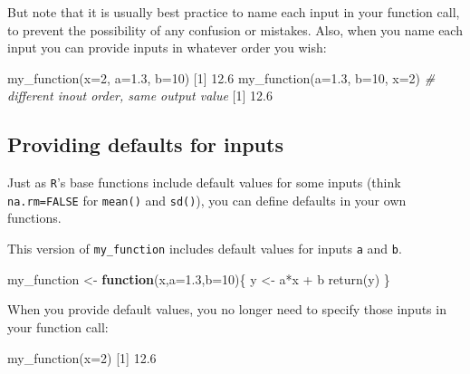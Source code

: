 \documentclass[
]{book}
\newenvironment{Shaded}{\begin{snugshade}}{\end{snugshade}}
\newcommand{\AttributeTok}[1]{\textcolor[rgb]{0.77,0.63,0.00}{#1}}
\newcommand{\CommentTok}[1]{\textcolor[rgb]{0.56,0.35,0.01}{\textit{#1}}}
\newcommand{\ControlFlowTok}[1]{\textcolor[rgb]{0.13,0.29,0.53}{\textbf{#1}}}
\newcommand{\DecValTok}[1]{\textcolor[rgb]{0.00,0.00,0.81}{#1}}
\newcommand{\FloatTok}[1]{\textcolor[rgb]{0.00,0.00,0.81}{#1}}
\newcommand{\FunctionTok}[1]{\textcolor[rgb]{0.00,0.00,0.00}{#1}}
\newcommand{\NormalTok}[1]{#1}
\newcommand{\OtherTok}[1]{\textcolor[rgb]{0.56,0.35,0.01}{#1}}
\newcommand{\SpecialCharTok}[1]{\textcolor[rgb]{0.00,0.00,0.00}{#1}}
\begin{document}
But note that it is usually best practice to name each input in your function call, to prevent the possibility of any confusion or mistakes. Also, when you name each input you can provide inputs in whatever order you wish:

\begin{Shaded}
\begin{Highlighting}[]
\FunctionTok{my\_function}\NormalTok{(}\AttributeTok{x=}\DecValTok{2}\NormalTok{, }\AttributeTok{a=}\FloatTok{1.3}\NormalTok{, }\AttributeTok{b=}\DecValTok{10}\NormalTok{)}
\NormalTok{[}\DecValTok{1}\NormalTok{] }\FloatTok{12.6}
\FunctionTok{my\_function}\NormalTok{(}\AttributeTok{a=}\FloatTok{1.3}\NormalTok{, }\AttributeTok{b=}\DecValTok{10}\NormalTok{, }\AttributeTok{x=}\DecValTok{2}\NormalTok{) }\CommentTok{\# different inout order, same output value}
\NormalTok{[}\DecValTok{1}\NormalTok{] }\FloatTok{12.6}
\end{Highlighting}
\end{Shaded}

\hypertarget{providing-defaults-for-inputs}{%
\subsection*{Providing defaults for inputs}\label{providing-defaults-for-inputs}}

Just as \texttt{R}'s base functions include default values for some inputs (think \texttt{na.rm=FALSE} for \texttt{mean()} and \texttt{sd()}), you can define defaults in your own functions.

This version of \texttt{my\_function} includes default values for inputs \texttt{a} and \texttt{b}.

\begin{Shaded}
\begin{Highlighting}[]
\NormalTok{my\_function }\OtherTok{\textless{}{-}} \ControlFlowTok{function}\NormalTok{(x,}\AttributeTok{a=}\FloatTok{1.3}\NormalTok{,}\AttributeTok{b=}\DecValTok{10}\NormalTok{)\{}
\NormalTok{  y }\OtherTok{\textless{}{-}}\NormalTok{ a}\SpecialCharTok{*}\NormalTok{x }\SpecialCharTok{+}\NormalTok{ b}
  \FunctionTok{return}\NormalTok{(y)}
\NormalTok{\}}
\end{Highlighting}
\end{Shaded}

When you provide default values, you no longer need to specify those inputs in your function call:

\begin{Shaded}
\begin{Highlighting}[]
\FunctionTok{my\_function}\NormalTok{(}\AttributeTok{x=}\DecValTok{2}\NormalTok{)}
\NormalTok{[}\DecValTok{1}\NormalTok{] }\FloatTok{12.6}
\end{Highlighting}
\end{Shaded}
\end{document}
